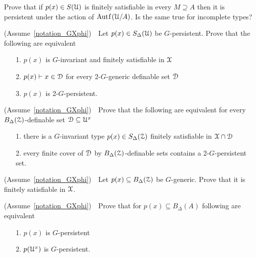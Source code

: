 \begin{exercise}
  Prove that if $p(x)\in S(\EuScript U)$ is finitely satisfiable in every $M\supseteq A$ then it is persistent under the action of $\mathord{\rm Aut\kern.15ex{f}\kern.15ex}(\EuScript U/A)$.
  Is the same true for incomplete types?
\end{exercise}

\begin{exercise}
  (Assume~\ref{notation_GXphi})\ \  
  Let $p(x)\in S_\Delta(\EuScript U)$ be $G$-persistent.
  Prove that the following are equivalent
  \begin{itemize}
    \item[1.] $p(x)$ is $G$-invariant and finitely satisfiable in $\EuScript X$
    \item[2.] $p(x)\vdash x\in\EuScript D$ for every 2-$G$-generic definable set $\EuScript D$
    \item[3.] $p(x)$ is 2-$G$-persistent.
  \end{itemize}
\end{exercise}

\begin{exercise}
  (Assume~\ref{notation_GXphi})\ \  
  Prove that the following are equivalent for every $B_\Delta({\EuScript Z})$-definable set $\EuScript D\subseteq\EuScript U^x$
  \begin{itemize}
    \item[1.] there is a $G$-invariant type $p(x)\in S_\Delta(\EuScript Z)$ finitely satisfiable in $\EuScript X\cap\EuScript D$
    \item[2.] every finite cover of $\EuScript D$ by $B_\Delta({\EuScript Z})$-definable sets contains a 2-$G$-persistent set.
  \end{itemize}
\end{exercise}

\begin{exercise}\label{ex_gen_sat}
  (Assume~\ref{notation_GXphi})\ \  
  Let $p(x)\subseteq B_\Delta(\EuScript Z)$ be $G$-generic.
  Prove that it is finitely satisfiable in $\EuScript X$.
\end{exercise}

\begin{exercise}\label{ex_persistent_types}
  (Assume~\ref{notation_GXphi})\ \  
  Prove that for $p(x)\subseteq B_\Delta(A)$ following are equivalent
  \begin{itemize}
    \item[1.] $p(x)$ is $G$-persistent
    \item[2.] $p(\EuScript U^x)$ is $G$-persistent.
  \end{itemize}
\end{exercise}


